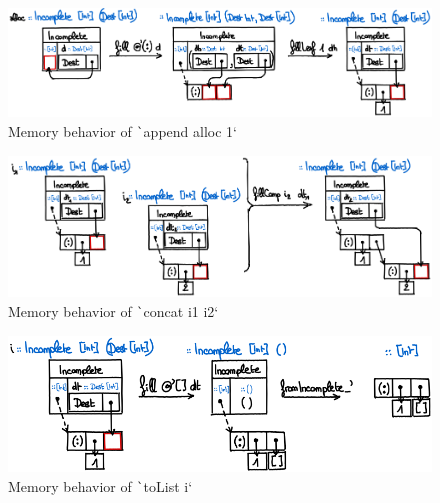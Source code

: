 \documentclass[english]{jflart}
\begin{document}
\begin{figure}[t]\centering
  \includegraphics[width=14cm]{dlist-append.png}
  \caption{Memory behavior of \texttt`append alloc 1`}
  \label{fig:schema-dlist-append}
\end{figure}

\begin{figure}[t]\centering
  \includegraphics[width=13.5cm]{dlist-concat.png}
  \caption{Memory behavior of \texttt`concat i1 i2`}
  \label{fig:schema-dlist-concat}
\end{figure}

\begin{figure}[t]\centering
  \includegraphics[width=11.5cm]{dlist-toList.png}
  \caption{Memory behavior of \texttt`toList i`}
  \label{fig:schema-dlist-toList}
\end{figure}
\end{document}
